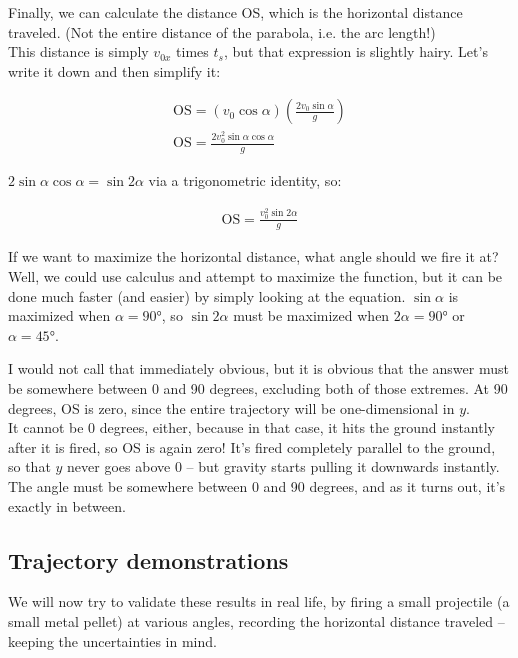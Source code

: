 Finally, we can calculate the distance OS, which is the horizontal distance traveled. (Not the entire distance of the parabola, i.e. the arc length!)\\
This distance is simply $v_{0x}$ times $t_s$, but that expression is slightly hairy. Let's write it down and then simplify it:

\begin{align}
\text{OS} = (v_0 \cos \alpha) \left(\frac{2 v_0 \sin \alpha}{g} \right)\\
\text{OS} = \frac{2 v_0^2 \sin \alpha \cos \alpha}{g}
\end{align}

$2 \sin \alpha \cos \alpha = \sin 2 \alpha$ via a trigonometric identity, so:

\begin{align}
\text{OS} = \frac{v_0^2 \sin 2\alpha}{g} \label{eq:lec3_os}
\end{align}

If we want to maximize the horizontal distance, what angle should we fire it at? Well, we could use calculus and attempt to maximize the function, but it can be done much faster (and easier) by simply looking at the equation. $\sin \alpha$ is maximized when $\alpha = \ang{90}$, so $\sin 2\alpha$ must be maximized when $2\alpha = \ang{90}$ or $\alpha = \ang{45}$.

I would not call that immediately obvious, but it is obvious that the answer must be somewhere between 0 and 90 degrees, excluding both of those extremes. At 90 degrees, OS is zero, since the entire trajectory will be one-dimensional in $y$.\\
It cannot be 0 degrees, either, because in that case, it hits the ground instantly after it is fired, so OS is again zero! It's fired completely parallel to the ground, so that $y$ never goes above 0 -- but gravity starts pulling it downwards instantly.\\
The angle must be somewhere between 0 and 90 degrees, and as it turns out, it's exactly in between.

\subsection{Trajectory demonstrations}

We will now try to validate these results in real life, by firing a small projectile (a small metal pellet) at various angles, recording the horizontal distance traveled -- keeping the uncertainties in mind.


